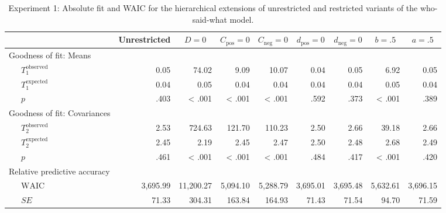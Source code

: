 \documentclass[
  man,floatsintext]{apa6}
\begin{document}
\begin{table}[tbp]

\begin{center}
\begin{threeparttable}

\caption{\label{tab:model-performance}Experiment 1: Absolute fit and WAIC for the hierarchical extensions of unrestricted and restricted variants of the who-said-what model.}

\scriptsize{

\begin{tabular}{lrrrrrrrr}
\toprule
  & \multicolumn{1}{c}{Unrestricted} & \multicolumn{1}{c}{$D = 0$} & \multicolumn{1}{c}{$C_{\mathrm{pos}} = 0$} & \multicolumn{1}{c}{$C_{\mathrm{neg}} = 0$} & \multicolumn{1}{c}{$d_{\mathrm{pos}} = 0$} & \multicolumn{1}{c}{$d_{\mathrm{neg}} = 0$} & \multicolumn{1}{c}{$b = .5$} & \multicolumn{1}{c}{$a = .5$}\\
\midrule
Goodness of fit: Means &  &  &  &  &  &  &  & \\
\ \ \ $T_1^{\mathrm{observed}}$ & 0.05 & 74.02 & 9.09 & 10.07 & 0.04 & 0.05 & 6.92 & 0.05\\
\ \ \ $T_1^{\mathrm{expected}}$ & 0.04 & 0.05 & 0.04 & 0.04 & 0.04 & 0.04 & 0.05 & 0.04\\
\ \ \ $p$ & .403 & < .001 & < .001 & < .001 & .592 & .373 & < .001 & .389\\
Goodness of fit: Covariances &  &  &  &  &  &  &  & \\
\ \ \ $T_2^{\mathrm{observed}}$ & 2.53 & 724.63 & 121.70 & 110.23 & 2.50 & 2.66 & 39.18 & 2.66\\
\ \ \ $T_2^{\mathrm{expected}}$ & 2.45 & 2.19 & 2.45 & 2.47 & 2.50 & 2.48 & 2.68 & 2.49\\
\ \ \ $p$ & .461 & < .001 & < .001 & < .001 & .484 & .417 & < .001 & .420\\
Relative predictive accuracy &  &  &  &  &  &  &  & \\
\ \ \ $\mathrm{WAIC}$ & 3,695.99 & 11,200.27 & 5,094.10 & 5,288.79 & 3,695.01 & 3,695.48 & 5,632.61 & 3,696.15\\
\ \ \ $\mathit{SE}$ & 71.33 & 304.31 & 163.84 & 164.93 & 71.43 & 71.54 & 94.70 & 71.59\\
\bottomrule
\end{tabular}

}

\end{threeparttable}
\end{center}

\end{table}
\end{document}
